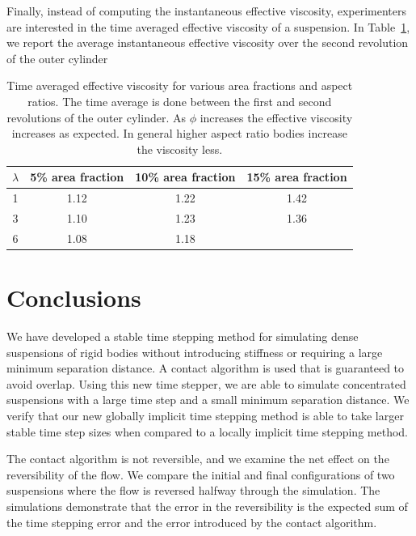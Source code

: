 \documentclass[AMA,STIX1COL]{WileyNJD-v2}
\begin{document}
Finally, instead of computing the instantaneous effective viscosity,
experimenters are interested in the time averaged effective viscosity of
a suspension. In Table~\ref{tab:viscosity}, we report the average
instantaneous effective viscosity over the second revolution of the
outer cylinder
\begin{table}[t]
  \centering
\caption{Time averaged effective viscosity for various area fractions
and aspect ratios. The time average is done between the first and second
revolutions of the outer cylinder. As $\phi$ increases the effective
viscosity increases as expected. In general higher aspect ratio bodies
increase the viscosity less. \label{tab:viscosity}}
\begin{tabular*}{500pt}{@{\extracolsep\fill}cccc@{\extracolsep\fill}}
  \toprule
$\lambda$ & 5\% area fraction  & 10\% area fraction  & 15\% area fraction\\
\midrule
1 & 1.12 & 1.22 & 1.42 \\
3 & 1.10 & 1.23 & 1.36 \\
6 & 1.08 & 1.18 &  \\
\bottomrule
\end{tabular*}
\end{table}



\section{Conclusions}\label{s:conclusions}
We have developed a stable time stepping method for simulating dense
suspensions of rigid bodies without introducing stiffness or requiring a
large minimum separation distance.  A contact algorithm is used that is
guaranteed to avoid overlap.  Using this new time stepper, we are able
to simulate concentrated suspensions with a large time step and a small
minimum separation distance.  We verify that our new globally implicit
time stepping method is able to take larger stable time step sizes when
compared to a locally implicit time stepping method.

The contact algorithm is not reversible, and we examine the net effect
on the reversibility of the flow.  We compare the initial and final
configurations of two suspensions where the flow is reversed halfway
through the simulation.  The simulations demonstrate that the error in
the reversibility is the expected sum of the time stepping error and the
error introduced by the contact algorithm.
\end{document}
